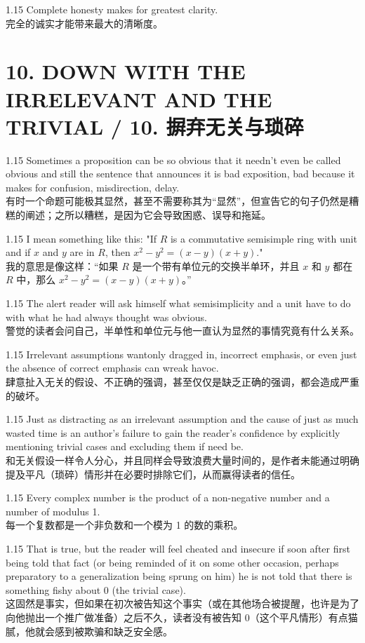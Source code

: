 \documentclass[12pt,a4paper]{article}
\newcommand{\bilingual}[2]{
    \begin{spacing}{1.15} %
        \noindent \normalsize #1 \\[-0.5ex] %
        \small \textcolor{blue!70!black}{#2} %
    \end{spacing}
    \vspace{0.8em} %
}
\begin{document}
\bilingual{Complete honesty makes for greatest clarity.}
{完全的诚实才能带来最大的清晰度。} %


\section*{10. DOWN WITH THE IRRELEVANT AND THE TRIVIAL / 10. 摒弃无关与琐碎} %

\bilingual{Sometimes a proposition can be so obvious that it needn't even be called obvious and still the sentence that announces it is bad exposition, bad because it makes for confusion, misdirection, delay.}
{有时一个命题可能极其显然，甚至不需要称其为“显然”，但宣告它的句子仍然是糟糕的阐述；之所以糟糕，是因为它会导致困惑、误导和拖延。} %

\bilingual{I mean something like this: "If $R$ is a commutative semisimple ring with unit and if $x$ and $y$ are in $R$, then $x^{2}-y^{2}=(x-y)(x+y)$."}
{我的意思是像这样：“如果 $R$ 是一个带有单位元的交换半单环，并且 $x$ 和 $y$ 都在 $R$ 中，那么 $x^{2}-y^{2}=(x-y)(x+y)$。”} %

\bilingual{The alert reader will ask himself what semisimplicity and a unit have to do with what he had always thought was obvious.}
{警觉的读者会问自己，半单性和单位元与他一直认为显然的事情究竟有什么关系。} %

\bilingual{Irrelevant assumptions wantonly dragged in, incorrect emphasis, or even just the absence of correct emphasis can wreak havoc.}
{肆意扯入无关的假设、不正确的强调，甚至仅仅是缺乏正确的强调，都会造成严重的破坏。} %

\bilingual{Just as distracting as an irrelevant assumption and the cause of just as much wasted time is an author's failure to gain the reader's confidence by explicitly mentioning trivial cases and excluding them if need be.}
{和无关假设一样令人分心，并且同样会导致浪费大量时间的，是作者未能通过明确提及平凡（琐碎）情形并在必要时排除它们，从而赢得读者的信任。} %

\bilingual{Every complex number is the product of a non-negative number and a number of modulus 1.}
{每一个复数都是一个非负数和一个模为 1 的数的乘积。} %

\bilingual{That is true, but the reader will feel cheated and insecure if soon after first being told that fact (or being reminded of it on some other occasion, perhaps preparatory to a generalization being sprung on him) he is not told that there is something fishy about 0 (the trivial case).}
{这固然是事实，但如果在初次被告知这个事实（或在其他场合被提醒，也许是为了向他抛出一个推广做准备）之后不久，读者没有被告知 0（这个平凡情形）有点猫腻，他就会感到被欺骗和缺乏安全感。} %
\end{document}
